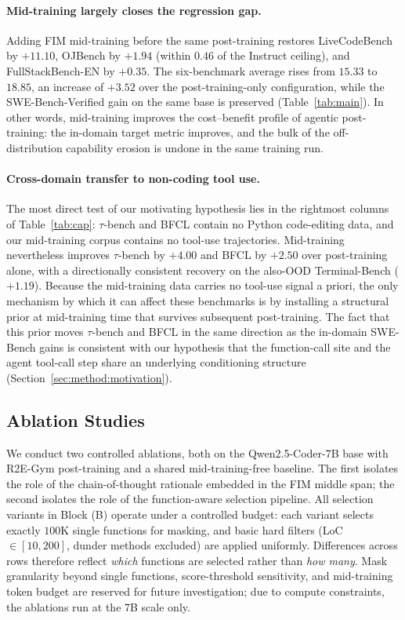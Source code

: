 \paragraph{Mid-training largely closes the regression gap.}
Adding FIM mid-training before the same post-training restores
LiveCodeBench by $+11.10$, OJBench by $+1.94$ (within $0.46$ of the
Instruct ceiling), and FullStackBench-EN by $+0.35$. The six-benchmark
average rises from $15.33$ to $18.85$, an increase of $+3.52$ over the
post-training-only configuration, while the SWE-Bench-Verified gain on
the same base is preserved (Table~\ref{tab:main}). In other words,
mid-training improves the cost--benefit profile of agentic post-training:
the in-domain target metric improves, and the bulk of the off-distribution
capability erosion is undone in the same training run.

\paragraph{Cross-domain transfer to non-coding tool use.}
The most direct test of our motivating hypothesis lies in the rightmost
columns of Table~\ref{tab:cap}: $\tau$-bench and BFCL contain no Python
code-editing data, and our mid-training corpus contains no tool-use
trajectories. Mid-training nevertheless improves $\tau$-bench by
$+4.00$ and BFCL by $+2.50$ over post-training alone, with a directionally
consistent recovery on the also-OOD Terminal-Bench ($+1.19$). Because the
mid-training data carries no tool-use signal a priori, the only mechanism
by which it can affect these benchmarks is by installing a structural
prior at mid-training time that survives subsequent post-training. The
fact that this prior moves $\tau$-bench and BFCL in the same direction
as the in-domain SWE-Bench gains is consistent with our hypothesis that
the function-call site and the agent tool-call step share an underlying
conditioning structure (Section~\ref{sec:method:motivation}).


\subsection{Ablation Studies}
\label{sec:exp:ablation}

We conduct two controlled ablations, both on the Qwen2.5-Coder-7B base
with R2E-Gym post-training and a shared mid-training-free baseline. The
first isolates the role of the chain-of-thought rationale embedded in the
FIM middle span; the second isolates the role of the function-aware
selection pipeline. All selection variants in Block (B) operate under a
controlled budget: each variant selects exactly $100$K single functions
for masking, and basic hard filters (LoC $\in [10, 200]$, dunder methods
excluded) are applied uniformly. Differences across rows therefore reflect
\emph{which} functions are selected rather than \emph{how many}. Mask
granularity beyond single functions, score-threshold sensitivity, and
mid-training token budget are reserved for future investigation; due to
compute constraints, the ablations run at the 7B scale only.

